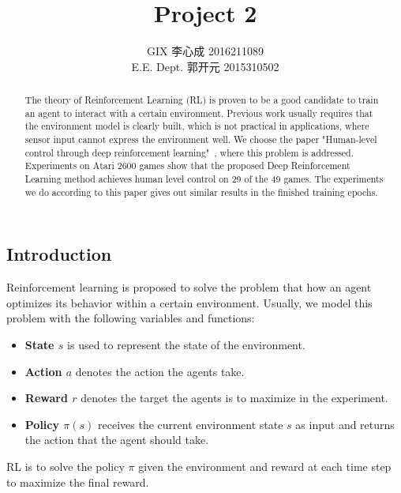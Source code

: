 \documentclass[10pt,twocolumn,letterpaper]{article}
\begin{document}
\begin{CJK}{UTF8}{gbsn}

\title{Project 2}

\author{GIX 李心成 2016211089\\
E.E. Dept. 郭开元 2015310502
}

\maketitle

\begin{abstract}

The theory of Reinforcement Learning (RL) is proven to be a good candidate to train an agent to interact with a certain environment. Previous work usually requires that the environment model is clearly built, which is not practical in applications, where sensor input cannot express the environment well. We choose the paper "Human-level control through deep reinforcement learning"~\cite{mnih2015human}, where this problem is addressed. Experiments on Atari 2600 games show that the proposed Deep Reinforcement Learning method achieves human level control on 29 of the 49 games. The experiments we do according to this paper gives out similar results in the finished training epochs.

\end{abstract}
\section{Introduction}
Reinforcement learning is proposed to solve the problem that how an agent optimizes its behavior within a certain environment. Usually, we model this problem with the following variables and functions:
\begin{itemize}
    \item \textbf{State $s$} is used to represent the state of the environment. 
    \item \textbf{Action $a$} denotes the action the agents take.
    \item \textbf{Reward $r$} denotes the target the agents is to maximize in the experiment.
    \item \textbf{Policy $\pi(s)$} receives the current environment state $s$ as input and returns the action that the agent should take.
\end{itemize}
RL is to solve the policy $\pi$ given the environment and reward at each time step to maximize the final reward.


\end{CJK}
\end{document}
